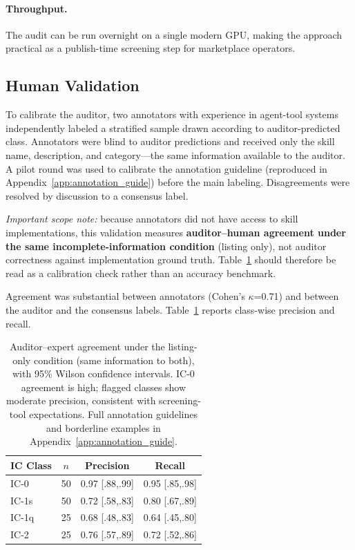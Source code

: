 \documentclass[11pt]{article}
\begin{document}
\paragraph{Throughput.}
The audit can be run overnight on a single modern GPU,
making the approach practical as a publish-time screening
step for marketplace operators.

\subsection{Human Validation}
\label{subsec:validation}

To calibrate the auditor, two annotators with experience
in agent-tool systems independently labeled a stratified
sample drawn according to auditor-predicted class.
Annotators were blind to auditor predictions and received
only the skill name, description, and category---the same
information available to the auditor.
A pilot round was used to calibrate the annotation
guideline (reproduced in Appendix~\ref{app:annotation_guide})
before the main labeling.
Disagreements were resolved by discussion to a consensus label.

\emph{Important scope note:} because annotators did not
have access to skill implementations, this validation
measures \textbf{auditor--human agreement under the same
incomplete-information condition} (listing only), not
auditor correctness against implementation ground truth.
Table~\ref{tab:validation} should therefore be read as a
calibration check rather than an accuracy benchmark.

Agreement was substantial between annotators
(Cohen's $\kappa$=0.71) and between
the auditor and the consensus labels. Table~\ref{tab:validation}
reports class-wise precision and recall.

\begin{table}[t]
\centering\small
\begin{tabular}{lccc}
\toprule
\textbf{IC Class} & \textbf{$n$} & \textbf{Precision} & \textbf{Recall} \\
\midrule
IC-0  & 50 & 0.97 \scriptsize{[.88,.99]} & 0.95 \scriptsize{[.85,.98]} \\
IC-1s & 50 & 0.72 \scriptsize{[.58,.83]} & 0.80 \scriptsize{[.67,.89]} \\
IC-1q & 25 & 0.68 \scriptsize{[.48,.83]} & 0.64 \scriptsize{[.45,.80]} \\
IC-2  & 25 & 0.76 \scriptsize{[.57,.89]} & 0.72 \scriptsize{[.52,.86]} \\
\bottomrule
\end{tabular}
\caption{Auditor--expert agreement under the listing-only
condition (same information to both), with 95\% Wilson
confidence intervals. IC-0 agreement is
high; flagged classes show moderate precision, consistent
with screening-tool expectations.
Full annotation guidelines and borderline examples in
Appendix~\ref{app:annotation_guide}.}
\label{tab:validation}
\end{table}
\end{document}
